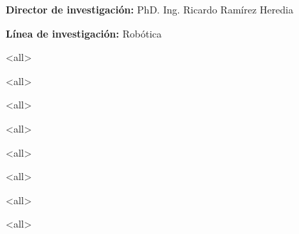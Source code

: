 \renewcommand{\tablename}{Tabla}

\maketitle
{}
{\large\textbf{Director de investigaci\'on:} PhD. Ing. Ricardo Ram\'irez Heredia}\par\vspace{0.7cm}
{\large\textbf{L\'inea de investigaci\'on:} Rob\'otica}

\mode<all> %

\mode<all> %

\mode<all> %

\mode<all> %

\mode<all> %

\mode<all> %

\mode<all> %

\mode<all> %

\mode*

% 
% 



